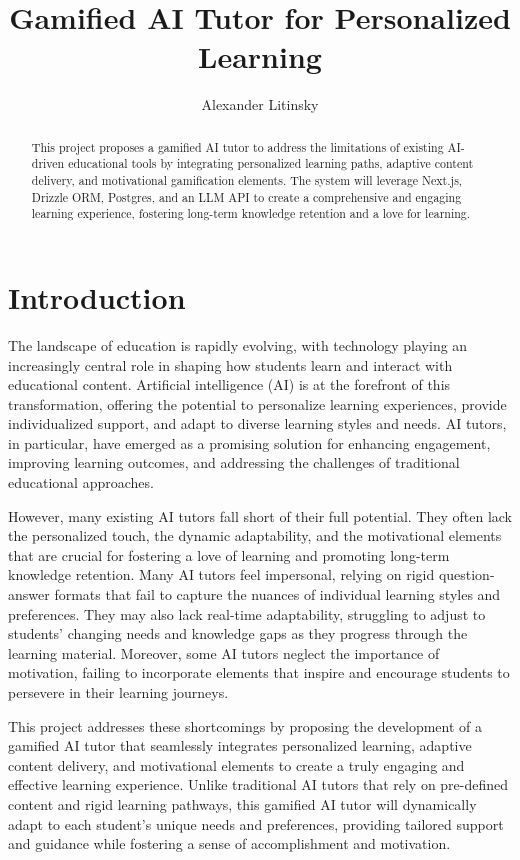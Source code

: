 \documentclass[
	letterpaper, %
]{jdf}
\author{Alexander Litinsky}
\title{Gamified AI Tutor for Personalized Learning}
\begin{document}
\maketitle

\begin{abstract}
    This project proposes a gamified AI tutor to address the limitations of existing AI-driven educational tools by integrating personalized learning paths, adaptive content delivery, and motivational gamification elements. The system will leverage Next.js, Drizzle ORM, Postgres, and an LLM API to create a comprehensive and engaging learning experience, fostering long-term knowledge retention and a love for learning.
\end{abstract}

\section{Introduction}
The landscape of education is rapidly evolving, with technology playing an increasingly central role in shaping how students learn and interact with educational content. Artificial intelligence (AI) is at the forefront of this transformation, offering the potential to personalize learning experiences, provide individualized support, and adapt to diverse learning styles and needs. AI tutors, in particular, have emerged as a promising solution for enhancing engagement, improving learning outcomes, and addressing the challenges of traditional educational approaches.

However, many existing AI tutors fall short of their full potential. They often lack the personalized touch, the dynamic adaptability, and the motivational elements that are crucial for fostering a love of learning and promoting long-term knowledge retention. Many AI tutors feel impersonal, relying on rigid question-answer formats that fail to capture the nuances of individual learning styles and preferences. They may also lack real-time adaptability, struggling to adjust to students' changing needs and knowledge gaps as they progress through the learning material. Moreover, some AI tutors neglect the importance of motivation, failing to incorporate elements that inspire and encourage students to persevere in their learning journeys.

This project addresses these shortcomings by proposing the development of a gamified AI tutor that seamlessly integrates personalized learning, adaptive content delivery, and motivational elements to create a truly engaging and effective learning experience. Unlike traditional AI tutors that rely on pre-defined content and rigid learning pathways, this gamified AI tutor will dynamically adapt to each student's unique needs and preferences, providing tailored support and guidance while fostering a sense of accomplishment and motivation.
\end{document}
